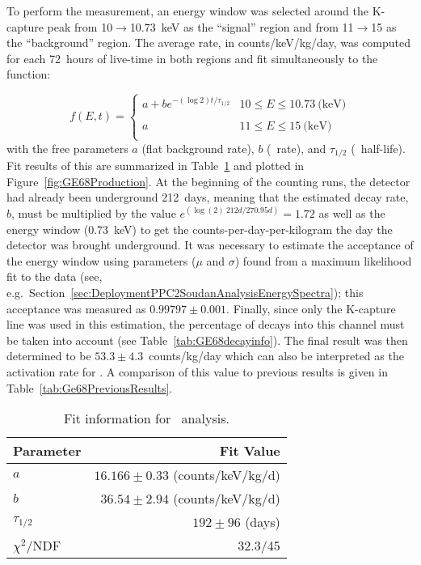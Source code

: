 	To perform the measurement, an energy window was selected around the K-capture peak from 10$\to$10.73~keV as the ``signal'' region and from 11$\to$15 as the ``background'' region.  The average rate, in counts/keV/kg/day, was computed for each 72~hours of live-time in both regions and fit simultaneously to the function:
	
			\begin{equation}
				f(E,t) = \left\{ 
				\begin{array}{lr} 
 					a + b e^{-\left( \log{2} \right) t/\tau_{1/2}} & 10 \leq E \leq 10.73~\textrm{(keV)}\\
					\\
					a & 11 \leq E \leq 15~\textrm{(keV)}\\
				\end{array} \right.			
			\end{equation}
with the free parameters $a$ (flat background rate), $b$ (\gersixeight~rate), and $\tau_{1/2}$ (\gersixeight~half-life).  Fit results of this are summarized in Table~\ref{tab:Ge68FitResults} and plotted in Figure~\ref{fig:GE68Production}.  At the beginning of the counting runs, the detector had already been underground 212~days, meaning that the estimated decay rate, $b$, must be multiplied by the value $e^{(\log(2)~212 d/270.95 d)} = 1.72$ as well as  the energy window (0.73~keV) to get the counts-per-day-per-kilogram the day the detector was brought underground.  It was necessary to estimate the acceptance of the energy window using parameters ($\mu$ and $\sigma$) found from a maximum likelihood fit to the data (see, e.g.~Section~\ref{sec:DeploymentPPC2SoudanAnalysisEnergySpectra}); this acceptance was measured as $0.99797\pm0.001$.  Finally, since only the K-capture line was used in this estimation, the percentage of decays into this channel must be taken into account (see Table~\ref{tab:GE68decayinfo}).  The final result was then determined to be $53.3\pm4.3$~counts/kg/day which can also be interpreted as the activation rate for \gersixeight.  A comparison of this value to previous results is given in Table~\ref{tab:Ge68PreviousResults}.

       			\begin{table}
				\centering
				\begin{tabular}{l|r}
					\hline
					Parameter & Fit Value \\
					\hline
					$a$ & $16.166\pm0.33$ (counts/keV/kg/d)  \\
					$b$ & $36.54\pm2.94$ (counts/keV/kg/d)  \\
					$\tau_{1/2}$ & $192\pm96$ (days) \\
					$\chi^{2}$/NDF & 32.3/45 \\					
					\hline
				\end{tabular}
				\caption[Fit information for \gersixeight~analysis]
				{Fit information for \gersixeight~analysis.}
				\label{tab:Ge68FitResults}	
			\end{table}	
			
